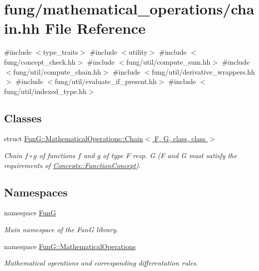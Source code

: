 \hypertarget{chain_8hh}{\section{fung/mathematical\-\_\-operations/chain.hh \-File \-Reference}
\label{chain_8hh}
}
{\ttfamily \#include $<$type\-\_\-traits$>$}\*
{\ttfamily \#include $<$utility$>$}\*
{\ttfamily \#include $<$fung/concept\-\_\-check.\-hh$>$}\*
{\ttfamily \#include $<$fung/util/compute\-\_\-sum.\-hh$>$}\*
{\ttfamily \#include $<$fung/util/compute\-\_\-chain.\-hh$>$}\*
{\ttfamily \#include $<$fung/util/derivative\-\_\-wrappers.\-hh$>$}\*
{\ttfamily \#include $<$fung/util/evaluate\-\_\-if\-\_\-present.\-hh$>$}\*
{\ttfamily \#include $<$fung/util/indexed\-\_\-type.\-hh$>$}\*
\subsection*{\-Classes}
\begin{DoxyCompactItemize}
\item 
struct \hyperlink{structFunG_1_1MathematicalOperations_1_1Chain}{\-Fun\-G\-::\-Mathematical\-Operations\-::\-Chain$<$ F, G, class, class $>$}
\begin{DoxyCompactList}\small\item\em \-Chain $ f\circ g $ of functions $f$ and $g$ of type \-F resp. \-G (\-F and \-G must satisfy the requirements of \hyperlink{structFunG_1_1Concepts_1_1FunctionConcept}{\-Concepts\-::\-Function\-Concept}). \end{DoxyCompactList}\end{DoxyCompactItemize}
\subsection*{\-Namespaces}
\begin{DoxyCompactItemize}
\item 
namespace \hyperlink{namespaceFunG}{\-Fun\-G}
\begin{DoxyCompactList}\small\item\em \-Main namespace of the \-Fun\-G library. \end{DoxyCompactList}\item 
namespace \hyperlink{namespaceFunG_1_1MathematicalOperations}{\-Fun\-G\-::\-Mathematical\-Operations}
\begin{DoxyCompactList}\small\item\em \-Mathematical operations and corresponding differentation rules. \end{DoxyCompactList}\end{DoxyCompactItemize}
